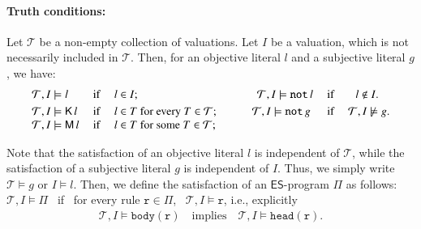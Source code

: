 \documentclass[submission,copyright,creativecommons]{eptcs}
\newcommand{\logic}[1]  { \ensuremath{\mathsf{#1}} }
\newcommand{\ES}  { \logic{ES} }
\newcommand{\lpnot}  { \mathtt{not} \, }
\newcommand{\epispec}  { \Pi }
\newcommand{\K}  { \mathsf{K} }
\newcommand{\M}  { \mathsf{M} }
\begin{document}
\paragraph{Truth conditions:} 
\label{sec:ES94 Truth conditions}
Let $\mathcal{T}$ be a non-empty collection of valuations.
Let $I$ be a valuation, which is not necessarily included in $\mathcal T$. Then, 
for an objective literal $l$ and a subjective literal $g$, we have:
%
$$\begin{array}{lcllcl}
\mathcal T, I \models l & \text{ if }& l\in I; \hspace{104pt}
\mathcal T, I \models \lpnot l & \text{ if }&\!\! l \notin I .
 \smallskip
\\
\mathcal{T},I \models \K\,l & \text{ if }& l \in T \text{ for every } T \in \mathcal{T};
\hspace{30pt}
\mathcal{T},I \models \lpnot g & \text{ if }& \mathcal{T}, I \not\models g.
\\
\mathcal{T}, I \models \M\,l & \text{ if }& l \in T \text{ for some } T \in \mathcal T;
&&
\end{array}$$

Note that the satisfaction of an objective literal $l$ is independent of $\mathcal T$,
while the satisfaction of a subjective literal $g$ is independent of $I$. 
Thus, we simply write $\mathcal T \models g$ or $I \models l$.
Then, we define the satisfaction of an $\ES$-program $\epispec$ as follows:
$\mathcal T, I \models \epispec$ \ if \ for every rule $\mathtt{r} \in \epispec$, \,
$\mathcal T, I \models \mathtt{r}$, i.e., explicitly 
\begin{align*}
\mathcal T, I \models \mathtt{body(r)} \text{~~ implies~~ }
\mathcal T, I \models \mathtt{head(r)}.
\end{align*}
\end{document}
